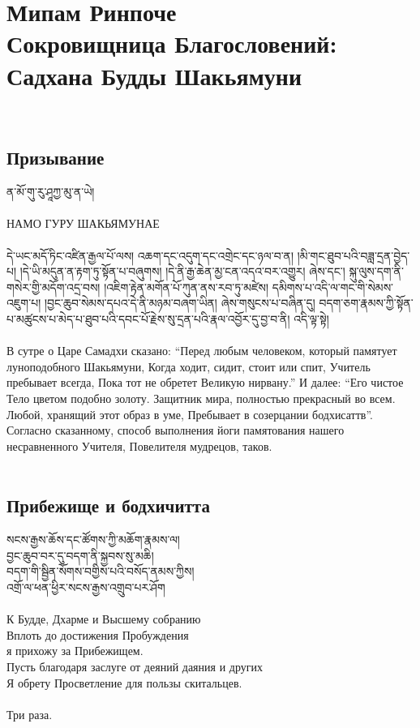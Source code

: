 \normalsize
\section{Мипам Ринпоче \\Сокровищница Благословений:\\Садхана Будды Шакьямуни }
\\
\vspace{1cm}

\subsection{Призывание}

\ti ན་མོ་གུ་རུ་ཤཱཀྱ་མུ་ན་ཡེ།\\
\\
\ru НАМО ГУРУ ШАКЬЯМУНАЕ\\
\\
\scriptsize
\ti
དེ་ཡང་མདོ་ཏིང་འཛིན་རྒྱལ་པོ་ལས། 
འཆག་དང་འདུག་དང་འགྲེང་དང་ཉལ་བ་ན། 
།མི་གང་ཐུབ་པའི་བཟླ་དྲན་བྱེད་པ། 
།དེ་ཡི་མདུན་ན་རྟག་ཏུ་སྟོན་པ་བཞུགས། 
།དེ་ནི་རྒྱ་ཆེན་མྱ་ངན་འདའ་བར་འགྱུར། 
ཞེས་དང་། 
སྐུ་ལུས་དག་ནི་གསེར་གྱི་མདོག་འདྲ་བས། 
།འཇིག་རྟེན་མགོན་པོ་ཀུན་ནས་རབ་ཏུ་མཛེས། 
དམིགས་པ་འདི་ལ་གང་གི་སེམས་འཇུག་པ། 
།བྱང་ཆུབ་སེམས་དཔའ་དེ་ནི་མཉམ་བཞག་ཡིན། 
ཞེས་གསུངས་པ་བཞིན་དུ། 
བདག་ཅག་རྣམས་ཀྱི་སྟོན་པ་མཚུངས་པ་མེད་པ་ཐུབ་པའི་དབང་པོ་རྗེས་སུ་དྲན་པའི་རྣལ་འབྱོར་དུ་བྱ་བ་ནི། 
འདི་ལྟ་སྟེ།\\
\\
\ru
В сутре о Царе Самадхи сказано:
“Перед любым человеком, который памятует луноподобного Шакьямуни,
Когда ходит, сидит, стоит или спит,
Учитель пребывает всегда,
Пока тот не обретет Великую нирвану.”
И далее:
“Его чистое Тело цветом подобно золоту.
Защитник мира, полностью прекрасный во всем.
Любой, хранящий этот образ в уме,
Пребывает в созерцании бодхисаттв”.
Согласно сказанному, способ выполнения йоги памятования нашего несравненного Учителя,
Повелителя мудрецов, таков.\\
\\
\normalsize
\newpage
\subsection{Прибежище и бодхичитта}
\vspace{0.5cm}
\ti
སངས་རྒྱས་ཆོས་དང་ཚོགས་ཀྱི་མཆོག་རྣམས་ལ།\\
བྱང་ཆུབ་བར་དུ་བདག་ནི་སྐྱབས་སུ་མཆི།\\
བདག་གི་སྦྱིན་སོགས་བགྱིས་པའི་བསོད་ནམས་ཀྱིས།\\
འགྲོ་ལ་ཕན་ཕྱིར་སངས་རྒྱས་འགྲུབ་པར་ཤོག\\
\\
\ru
К Будде, Дхарме и Высшему собранию\\
Вплоть до достижения Пробуждения\\
я прихожу за Прибежищем.\\
Пусть благодаря заслуге от деяний даяния и других\\
Я обрету Просветление для пользы скитальцев.\\
\\
Три раза.\\

